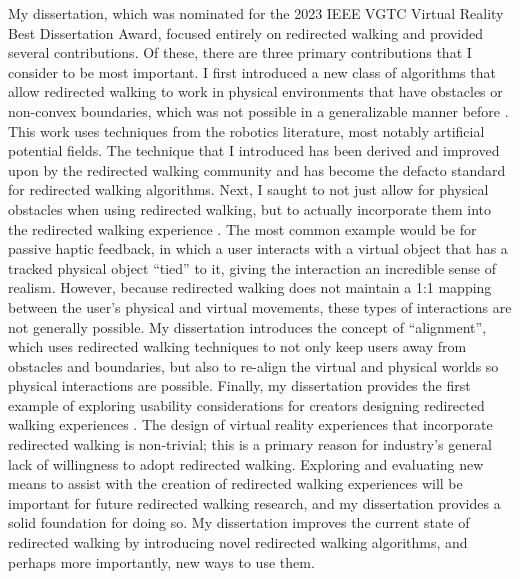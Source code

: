 My dissertation, which was nominated for the 2023 IEEE VGTC Virtual Reality Best Dissertation Award, focused entirely on redirected walking and provided several contributions. Of these, there are three primary contributions that I consider to be most important. I first introduced a new class of algorithms that allow redirected walking to work in physical environments that have obstacles or non-convex boundaries, which was not possible in a generalizable manner before \cite{thomas2019general}. This work uses techniques from the robotics literature, most notably artificial potential fields. The technique that I introduced has been derived and improved upon by the redirected walking community and has become the defacto standard for redirected walking algorithms. Next, I saught to not just allow for physical obstacles when using redirected walking, but to actually incorporate them into the redirected walking experience \cite{thomas2020towards, thomas2020reactive, thomas2022inverse}. The most common example would be for passive haptic feedback, in which a user interacts with a virtual object that has a tracked physical object ``tied'' to it, giving the interaction an incredible sense of realism. However, because redirected walking does not maintain a 1:1 mapping between the user's physical and virtual movements, these types of interactions are not generally possible. My dissertation introduces the concept of ``alignment'', which uses redirected walking techniques to not only keep users away from obstacles and boundaries, but also to re-align the virtual and physical worlds so physical interactions are possible. Finally, my dissertation provides the first example of exploring usability considerations for creators designing redirected walking experiences \cite{thomas2022inverse}. The design of virtual reality experiences that incorporate redirected walking is non-trivial; this is a primary reason for industry's general lack of willingness to adopt redirected walking. Exploring and evaluating new means to assist with the creation of redirected walking experiences will be important for future redirected walking research, and my dissertation provides a solid foundation for doing so. My dissertation improves the current state of redirected walking by introducing novel redirected walking algorithms, and perhaps more importantly, new ways to use them.

